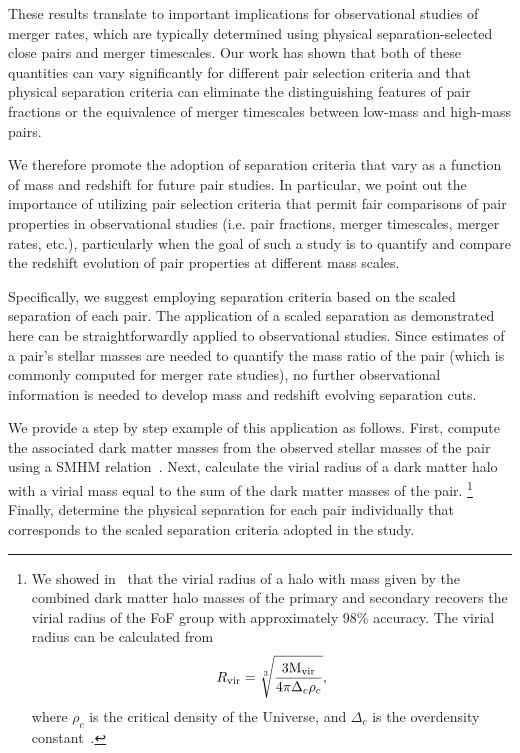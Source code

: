 \documentclass[twocolumn,linenumbers]{aastex631}
\newcommand{\chambe}{\citet{Chamberlain2024}}
\begin{document}
            These results translate to important implications for observational studies of merger rates, which are typically determined using physical separation-selected close pairs and merger timescales. 
            Our work has shown that both of these quantities can vary significantly for different pair selection criteria and that physical separation criteria can eliminate the distinguishing features of pair fractions or the equivalence of merger timescales between low-mass and high-mass pairs.
             
            We therefore promote the adoption of separation criteria that vary as a function of mass and redshift for future pair studies. 
            In particular, we point out the importance of utilizing pair selection criteria that permit fair comparisons of pair properties in observational studies (i.e. pair fractions, merger timescales, merger rates, etc.), particularly when the goal of such a study is to quantify and compare the redshift evolution of pair properties at different mass scales.
            
            Specifically, we suggest employing separation criteria based on the scaled separation of each pair. 
            The application of a scaled separation as demonstrated here can be straightforwardly applied to observational studies. 
            Since estimates of a pair's stellar masses are needed to quantify the mass ratio of the pair (which is commonly computed for merger rate studies), no further observational information is needed to develop mass and redshift evolving separation cuts. 
            
            We provide a step by step example of this application as follows. First, compute the associated dark matter masses from the observed stellar masses of the pair using a SMHM relation~\citep[in this study, we employ that of][]{Moster2013}.
            Next, calculate the virial radius of a dark matter halo with a virial mass equal to the sum of the dark matter masses of the pair.
            \footnote{We showed in~\chambe{} that the virial radius of a halo with mass given by the combined dark matter halo masses of the primary and secondary recovers the virial radius of the FoF group with approximately 98\% accuracy. The virial radius can be calculated from
            \begin{equation}\label{eq}
                \Rvir = \sqrt[3]{\frac{3\rm M_{vir}}{4\pi \Delta_{c}\rho_{c}}},
            \end{equation} 
            where $\rho_c$ is the critical density of the Universe, and $\Delta_{c}$ is the overdensity constant~\citep[see][]{Binney2008}.}
            Finally, determine the physical separation for each pair individually that corresponds to the scaled separation criteria adopted in the study.
\end{document}
